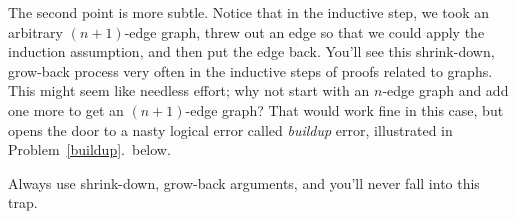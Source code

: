 The second point is more subtle.  Notice that in the inductive step, we
took an arbitrary $(n+1)$-edge graph, threw out an edge so that we could
apply the induction assumption, and then put the edge back.  You'll see
this shrink-down, grow-back process very often in the inductive steps of
proofs related to graphs.  This might seem like needless effort; why not
start with an $n$-edge graph and add one more to get an $(n+1)$-edge
graph?  That would work fine in this case, but opens the door to a nasty
logical error called \emph{buildup} error, illustrated in
Problem~\ref{buildup}.\ below.
\iffalse You'll see an example in class.\fi
Always use shrink-down, grow-back arguments, and you'll never
fall into this trap.




